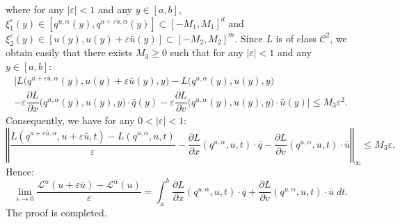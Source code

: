 \documentclass[english,11pt,reqno]{smfart}
\def\di{\displaystyle}
\def\eps{\varepsilon}
\newcommand{\LL}{\mathcal{L}}
\newcommand{\CC}{\mathscr{C}}
\newcommand{\abs}[1]{\left\vert #1 \right\vert}
\begin{document}
where for any $\abs{\eps} <1$ and any $y \in [a,b]$, $\xi^\eps_1 (y) \in [q^{u,\alpha}(y),q^{u+\eps \bar{u},\alpha}(y)] \subset [-M_1,M_1]^d$ and $\xi^\eps_2 (y) \in [u(y),u(y)+\eps \bar{u}(y)] \subset [-M_2,M_2]^m$. Since $L$ is of class $\CC^2$, we obtain easily that there exists $M_3 \geq 0$ such that for any $\vert \eps \vert < 1$ and any $y \in [a,b]$: 
\begin{multline}
\Big\vert L\big(q^{u+\eps \bar{u},\alpha}(y),u(y)+\eps \bar{u}(y),y\big) - L\big(q^{u,\alpha}(y),u(y),y\big) \\ - \eps \dfrac{\partial L}{\partial x} \big(q^{u,\alpha}(y),u(y),y\big) \cdot \bar{q}(y) - \eps \dfrac{\partial L}{\partial v} \big(q^{u,\alpha}(y),u(y),y\big) \cdot \bar{u}(y) \Big\vert \leq M_3 \eps^2.
\end{multline}
Consequently, we have for any $0 < \vert \eps \vert < 1$:
\begin{equation}
\left\Vert \dfrac{L(q^{u+\eps \bar{u},\alpha},u+\eps \bar{u},t) - L(q^{u,\alpha},u,t)}{\eps} - \dfrac{\partial L}{\partial x} (q^{u,\alpha},u,t) \cdot \bar{q} -  \dfrac{\partial L}{\partial v} (q^{u,\alpha},u,t) \cdot \bar{u} \right\Vert_{\infty} \leq M_3 \eps.
\end{equation}
Hence:
\begin{equation}
\lim\limits_{\eps \rightarrow 0} \dfrac{\LL^\alpha(u+\eps \bar{u})-\LL^\alpha(u)}{\eps} =  \di \int_a^b \dfrac{\partial L}{\partial x} (q^{u,\alpha},u,t) \cdot \bar{q} + \dfrac{\partial L}{\partial v} (q^{u,\alpha},u,t) \cdot \bar{u} \; dt.
\end{equation}
The proof is completed.
\end{document}
